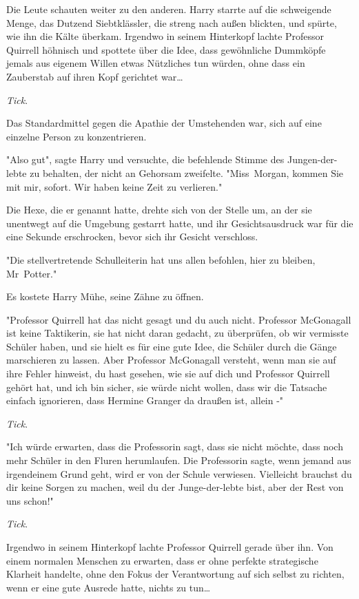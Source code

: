 {Die Leute schauten weiter zu den anderen. Harry starrte auf die schweigende Menge, das Dutzend Siebtklässler, die streng nach außen blickten, und spürte, wie ihn die Kälte überkam. Irgendwo in seinem Hinterkopf lachte Professor Quirrell höhnisch und spottete über die Idee, dass gewöhnliche Dummköpfe jemals aus eigenem Willen etwas Nützliches tun würden, ohne dass ein Zauberstab auf ihren Kopf gerichtet war…

\emph{Tick}.

Das Standardmittel gegen die Apathie der Umstehenden war, sich auf eine einzelne Person zu konzentrieren.

"Also gut", sagte Harry und versuchte, die befehlende Stimme des Jungen-der-lebte zu behalten, der nicht an Gehorsam zweifelte. "Miss~Morgan, kommen Sie mit mir, sofort. Wir haben keine Zeit zu verlieren."

Die Hexe, die er genannt hatte, drehte sich von der Stelle um, an der sie unentwegt auf die Umgebung gestarrt hatte, und ihr Gesichtsausdruck war für die eine Sekunde erschrocken, bevor sich ihr Gesicht verschloss.

"Die stellvertretende Schulleiterin hat uns allen befohlen, hier zu bleiben, Mr~Potter."

Es kostete Harry Mühe, seine Zähne zu öffnen.

"Professor Quirrell hat das nicht gesagt und du auch nicht. Professor McGonagall ist keine Taktikerin, sie hat nicht daran gedacht, zu überprüfen, ob wir vermisste Schüler haben, und sie hielt es für eine gute Idee, die Schüler durch die Gänge marschieren zu lassen. Aber Professor McGonagall versteht, wenn man sie auf ihre Fehler hinweist, du hast gesehen, wie sie auf dich und Professor Quirrell gehört hat, und ich bin sicher, sie würde nicht wollen, dass wir die Tatsache einfach ignorieren, dass Hermine Granger da draußen ist, allein -"

\emph{Tick}.

"Ich würde erwarten, dass die Professorin sagt, dass sie nicht möchte, dass noch mehr Schüler in den Fluren herumlaufen. Die Professorin sagte, wenn jemand aus irgendeinem Grund geht, wird er von der Schule verwiesen. Vielleicht brauchst du dir keine Sorgen zu machen, weil du der Junge-der-lebte bist, aber der Rest von uns schon!"

\emph{Tick}.

Irgendwo in seinem Hinterkopf lachte Professor Quirrell gerade über ihn. Von einem normalen Menschen zu erwarten, dass er ohne perfekte strategische Klarheit handelte, ohne den Fokus der Verantwortung auf sich selbst zu richten, wenn er eine gute Ausrede hatte, nichts zu tun…

}
